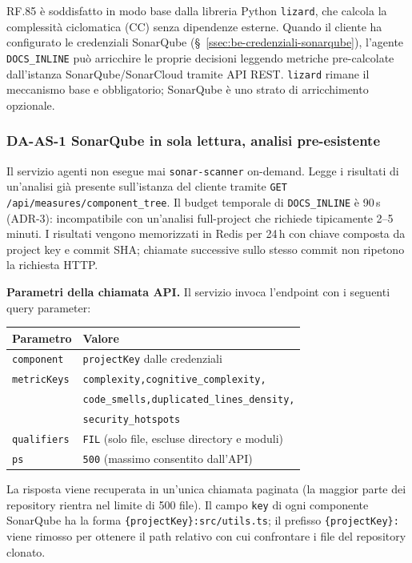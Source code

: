 \documentclass[11pt,a4paper]{article}
\begin{document}
RF.85 è soddisfatto in modo base dalla libreria Python \texttt{lizard}, che calcola la complessità ciclomatica (CC) senza dipendenze esterne. Quando il cliente ha configurato le credenziali SonarQube (\S~\ref{ssec:be-credenziali-sonarqube}), l'agente \texttt{DOCS\_INLINE} può arricchire le proprie decisioni leggendo metriche pre-calcolate dall'istanza SonarQube/SonarCloud tramite API REST. \texttt{lizard} rimane il meccanismo base e obbligatorio; SonarQube è uno strato di arricchimento opzionale.

\subsubsection*{DA-AS-1 \textemdash{} SonarQube in sola lettura, analisi pre-esistente}
Il servizio agenti non esegue mai \texttt{sonar-scanner} on-demand. Legge i risultati di un'analisi già presente sull'istanza del cliente tramite \texttt{GET /api/measures/component\_tree}. Il budget temporale di \texttt{DOCS\_INLINE} è 90\,s (ADR-3): incompatibile con un'analisi full-project che richiede tipicamente 2--5 minuti. I risultati vengono memorizzati in Redis per 24\,h con chiave composta da project key e commit SHA; chiamate successive sullo stesso commit non ripetono la richiesta HTTP.

\medskip
\noindent\textbf{Parametri della chiamata API.} Il servizio invoca l'endpoint con i seguenti query parameter:

\begin{center}
\begin{tabular}{ll}
\toprule
Parametro & Valore \\
\midrule
\texttt{component}   & \texttt{projectKey} dalle credenziali \\
\texttt{metricKeys}  & \texttt{complexity,cognitive\_complexity,} \\
                     & \texttt{code\_smells,duplicated\_lines\_density,} \\
                     & \texttt{security\_hotspots} \\
\texttt{qualifiers}  & \texttt{FIL} (solo file, escluse directory e moduli) \\
\texttt{ps}          & \texttt{500} (massimo consentito dall'API) \\
\bottomrule
\end{tabular}
\end{center}

\noindent La risposta viene recuperata in un'unica chiamata paginata (la maggior parte dei repository rientra nel limite di 500 file). Il campo \texttt{key} di ogni componente SonarQube ha la forma \texttt{\{projectKey\}:src/utils.ts}; il prefisso \texttt{\{projectKey\}:} viene rimosso per ottenere il path relativo con cui confrontare i file del repository clonato.
\end{document}
